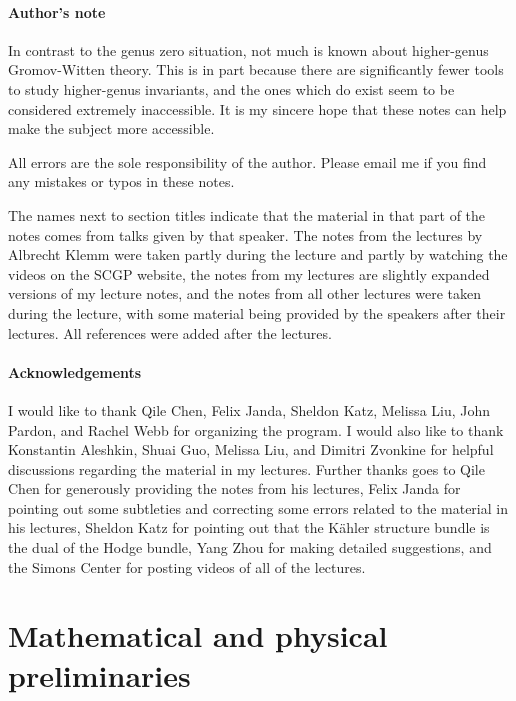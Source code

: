 \documentclass[10pt]{amsart}
\theoremstyle{definition}
\theoremstyle{remark}
\theoremstyle{plain}
\theoremstyle{definition}
\theoremstyle{remark}
\newcommand{\1}{\mathbf{1}}
\newcommand{\2}{\mathbf{2}}
\newcommand{\3}{\mathbf{3}}
\begin{document}
\subsection*{Author's note}%
\label{sub:Disclaimer}

In contrast to the genus zero situation, not much is known about higher-genus Gromov-Witten theory. This is in part because there are significantly fewer tools to study higher-genus invariants, and the ones which do exist seem to be considered extremely inaccessible. It is my sincere hope that these notes can help make the subject more accessible. 

All errors are the sole responsibility of the author. Please email me if you find any mistakes or typos in these notes.

The names next to section titles indicate that the material in that part of the notes comes from talks given by that speaker. The notes from the lectures by Albrecht Klemm were taken partly during the lecture and partly by watching the videos on the SCGP website, the notes from my lectures are slightly expanded versions of my lecture notes, and the notes from all other lectures were taken during the lecture, with some material being provided by the speakers after their lectures. All references were added after the lectures.

\subsection*{Acknowledgements}%
\label{sub:Acknowledgements}

I would like to thank Qile Chen, Felix Janda, Sheldon Katz, Melissa Liu, John Pardon, and Rachel Webb for organizing the program. I would also like to thank Konstantin Aleshkin, Shuai Guo, Melissa Liu, and Dimitri Zvonkine for helpful discussions regarding the material in my lectures. Further thanks goes to Qile Chen for generously providing the notes from his lectures, Felix Janda for pointing out some subtleties and correcting some errors related to the material in his lectures, Sheldon Katz for pointing out that the K\"ahler structure bundle is the dual of the Hodge bundle, Yang Zhou for making detailed suggestions, and the Simons Center for posting videos of all of the lectures.


\part{Mathematical and physical preliminaries}
\label{pt:prelim}
\end{document}
